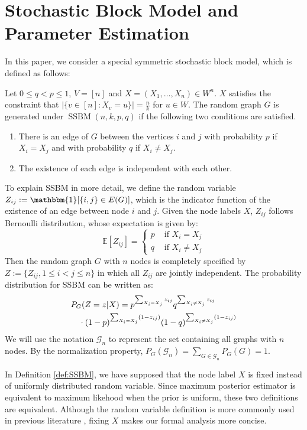 \documentclass[entropy,article,submit,moreauthors,pdftex]{Definitions/mdpi}
\newcommand{\cG}{\mathcal{G}}
\newcommand{\1}{\mathbbm{1}}
\DeclareMathOperator{\SSBM}{SSBM}
\begin{document}
\section{Stochastic Block Model and Parameter Estimation}\label{sec:psbm}
In this paper, we consider a special symmetric stochastic block model, which is defined as follows:
	\begin{Definition} \label{def:SSBM}
	Let $0\leq q<p\leq 1$, $V=[n]$ and $X=(X_1,\dots,X_n)\in W^n$. $X$ satisfies the constraint that $|\{v \in [n] : X_v = u\}| = \frac{n}{k}$ for $u\in W$.
	The random graph $G$ is generated under $\SSBM(n,k,p,q)$ if the following two conditions are satisfied.
	\begin{enumerate}
	\item There is an edge of $G$ between the vertices $i$ and $j$ with probability $p$ if $X_i=X_j$ and with probability $q$ if $X_i \neq X_j$.
	\item The existence of each edge is independent with each other.
	\end{enumerate}
\end{Definition}
To explain SSBM in more detail,
we define the random variable $Z_{ij}:=\mathbbm{1}[\{i,j\} \in E(G)]$, which is the indicator function of the existence of an edge between node $i$ and $j$.
Given the node labels $X$, $Z_{ij}$ follows Bernoulli distribution, whose expectation is given by:
\begin{equation}
\mathbb{E}[Z_{ij}] =
\begin{cases}
p & \textrm{ if } X_i = X_j \\ 
q & \textrm{ if }  X_i \neq X_j
\end{cases}
\end{equation}
Then the random graph $G$ with $n$ nodes
is completely specified by $Z:=\{Z_{ij}, 1\leq i<j\leq n\}$ in which all $Z_{ij}$ are jointly independent.
The probability distribution for SSBM can be written as:
\begin{align}
&P_G(Z = z| X) = p^{\sum_{X_i = X_j} z_{ij}}q^{\sum_{X_i \neq X_j} z_{ij}} \notag \\
&\quad \cdot (1-p)^{\sum_{X_i = X_j} (1-z_{ij})}(1-q)^{\sum_{X_i \neq X_j} (1-z_{ij})} \label{eq:GmL}
\end{align}
We will use the notation $\cG_n$ to represent the set containing all graphs with $n$ nodes. By the normalization property,
$P_G(\cG_n) = \sum_{G\in \cG_n}P_G(G)=1$.

In Definition \ref{def:SSBM}, we have supposed that the node label $X$ is fixed instead of uniformly distributed random variable.
Since maximum posterior estimator is equivalent to maximum likehood when the prior is uniform,
these two definitions are equivalent. Although the random variable definition is more commonly used in previous literature \cite{abbe2017community}, fixing $X$ makes our formal analysis more concise.
\end{document}
